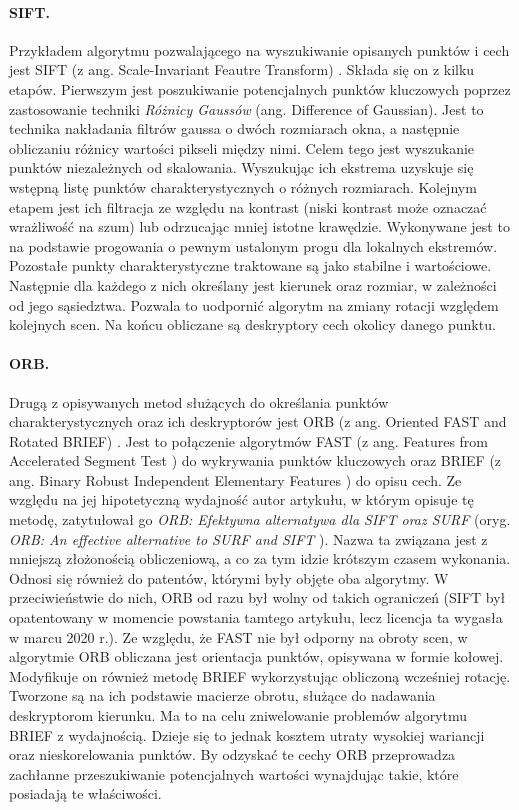 \paragraph{SIFT.} Przykładem algorytmu pozwalającego na wyszukiwanie opisanych punktów i cech jest SIFT (z ang. Scale-Invariant Feautre Transform) \cite{SIFT}\cite{SIFT_opencv}. Składa się on z kilku etapów. Pierwszym jest poszukiwanie potencjalnych punktów kluczowych poprzez zastosowanie techniki \textit{Różnicy Gaussów} (ang. Difference of Gaussian). Jest to technika nakładania filtrów gaussa o dwóch rozmiarach okna, a następnie obliczaniu różnicy wartości pikseli między nimi. Celem tego jest wyszukanie punktów niezależnych od skalowania. Wyszukując ich ekstrema uzyskuje się wstępną listę punktów charakterystycznych o różnych rozmiarach. Kolejnym etapem jest ich filtracja ze względu na kontrast (niski kontrast może oznaczać wrażliwość na szum) lub odrzucając mniej istotne krawędzie. Wykonywane jest to na podstawie progowania o pewnym ustalonym progu dla lokalnych ekstremów. Pozostałe punkty charakterystyczne traktowane są jako stabilne i wartościowe. Następnie dla każdego z nich określany jest kierunek oraz rozmiar, w zależności od jego sąsiedztwa. Pozwala to uodpornić algorytm na zmiany rotacji względem kolejnych scen. Na końcu obliczane są deskryptory cech okolicy danego punktu.



\paragraph{ORB.} Drugą z opisywanych metod służących do określania punktów charakterystycznych oraz ich deskryptorów jest ORB (z ang. Oriented FAST and Rotated BRIEF) \cite{ORB}\cite{ORB_opencv}. Jest to połączenie algorytmów FAST (z ang. Features from Accelerated Segment Test \cite{fast}) do wykrywania punktów kluczowych oraz BRIEF (z ang. Binary Robust Independent Elementary Features \cite{brief}) do opisu cech. Ze względu na jej hipotetyczną wydajność autor artykułu, w którym opisuje tę metodę, zatytułował go \textit{ORB: Efektywna alternatywa dla SIFT oraz SURF} (oryg. \textit{ORB: An effective alternative to SURF and SIFT} \cite{ORB}). Nazwa ta związana jest z mniejszą złożonością obliczeniową, a co za tym idzie krótszym czasem wykonania. Odnosi się również do patentów, którymi były objęte oba algorytmy. W przeciwieństwie do nich, ORB od razu był wolny od takich ograniczeń (SIFT był opatentowany w momencie powstania tamtego artykułu, lecz licencja ta wygasła w marcu 2020 r.). Ze względu, że FAST nie był odporny na obroty scen, w algorytmie ORB obliczana jest orientacja punktów, opisywana w formie kołowej. Modyfikuje on również metodę BRIEF wykorzystując obliczoną wcześniej rotację. Tworzone są na ich podstawie macierze obrotu, służące do nadawania deskryptorom kierunku. Ma to na celu zniwelowanie problemów algorytmu BRIEF z wydajnością. Dzieje się to jednak kosztem utraty wysokiej wariancji oraz nieskorelowania punktów. By odzyskać te cechy ORB przeprowadza zachłanne przeszukiwanie potencjalnych wartości wynajdując takie, które posiadają te właściwości. 



